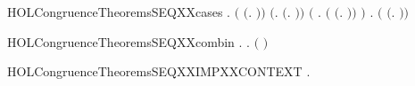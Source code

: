 \begin{SaveVerbatim}{HOLCongruenceTheoremsSEQXXcases}
\HOLTokenTurnstile{} \HOLSymConst{\HOLTokenForall{}}.
         \HOLSymConst{\HOLTokenEquiv{}}
       \ensuremath{(} \HOLSymConst{\ensuremath{=}} \ensuremath{(}\HOLTokenLambda{}. \ensuremath{)}\ensuremath{)} \HOLSymConst{\HOLTokenDisj{}} \ensuremath{(}\HOLSymConst{\HOLTokenExists{}}.  \HOLSymConst{\ensuremath{=}} \ensuremath{(}\HOLTokenLambda{}. \ensuremath{)}\ensuremath{)} \HOLSymConst{\HOLTokenDisj{}}
       \ensuremath{(}\HOLSymConst{\HOLTokenExists{}} . \ensuremath{(} \HOLSymConst{\ensuremath{=}} \ensuremath{(}\HOLTokenLambda{}. \HOLSymConst{\ensuremath{\ldotp}} \ensuremath{)}\ensuremath{)} \HOLSymConst{\HOLTokenConj{}}  \ensuremath{)} \HOLSymConst{\HOLTokenDisj{}}
       \HOLSymConst{\HOLTokenExists{}} . \ensuremath{(} \HOLSymConst{\ensuremath{=}} \ensuremath{(}\HOLTokenLambda{}.   \HOLSymConst{\ensuremath{+}}  \ensuremath{)}\ensuremath{)} \HOLSymConst{\HOLTokenConj{}}   \HOLSymConst{\HOLTokenConj{}}  
\end{SaveVerbatim}
\newcommand{\HOLCongruenceTheoremsSEQXXcases}{\UseVerbatim{HOLCongruenceTheoremsSEQXXcases}}
\begin{SaveVerbatim}{HOLCongruenceTheoremsSEQXXcombin}
\HOLTokenTurnstile{} \HOLSymConst{\HOLTokenForall{}}.   \HOLSymConst{\HOLTokenImp{}} \HOLSymConst{\HOLTokenForall{}}.   \HOLSymConst{\HOLTokenImp{}}  \ensuremath{(} \HOLConst{\HOLTokenCompose} \ensuremath{)}
\end{SaveVerbatim}
\newcommand{\HOLCongruenceTheoremsSEQXXcombin}{\UseVerbatim{HOLCongruenceTheoremsSEQXXcombin}}
\begin{SaveVerbatim}{HOLCongruenceTheoremsSEQXXIMPXXCONTEXT}
\HOLTokenTurnstile{} \HOLSymConst{\HOLTokenForall{}}.   \HOLSymConst{\HOLTokenImp{}}  
\end{SaveVerbatim}
